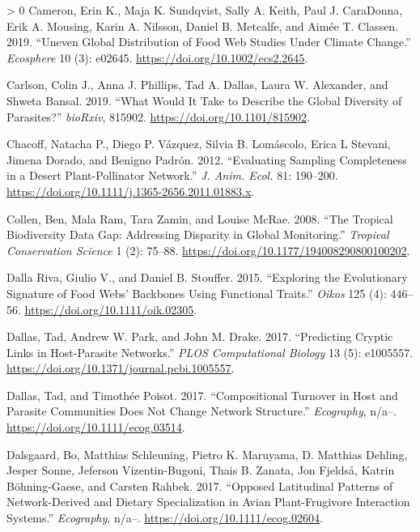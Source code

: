 \documentclass[11pt]{article}
\newlength{\cslhangindent}
\newenvironment{CSLReferences}[3] %
 {%
  \setlength{\parindent}{0pt}
  \ifodd #1 \everypar{\setlength{\hangindent}{\cslhangindent}}\ignorespaces\fi
  \ifnum #2 > 0
  \setlength{\parskip}{#2\baselineskip}
  \fi
 }%
 {}
\begin{document}
\begin{CSLReferences}{1}{0}
\leavevmode\hypertarget{ref-Cameron2019UneGlo}{}%
Cameron, Erin K., Maja K. Sundqvist, Sally A. Keith, Paul J. CaraDonna,
Erik A. Mousing, Karin A. Nilsson, Daniel B. Metcalfe, and Aimée T.
Classen. 2019. {``Uneven Global Distribution of Food Web Studies Under
Climate Change.''} \emph{Ecosphere} 10 (3): e02645.
\url{https://doi.org/10.1002/ecs2.2645}.

\leavevmode\hypertarget{ref-Carlson2019WhaWou}{}%
Carlson, Colin J., Anna J. Phillips, Tad A. Dallas, Laura W. Alexander,
and Shweta Bansal. 2019. {``What Would It Take to Describe the Global
Diversity of Parasites?''} \emph{bioRxiv}, 815902.
\url{https://doi.org/10.1101/815902}.

\leavevmode\hypertarget{ref-Chacoff2012EvaSam}{}%
Chacoff, Natacha P., Diego P. Vázquez, Silvia B. Lomáscolo, Erica L
Stevani, Jimena Dorado, and Benigno Padrón. 2012. {``Evaluating Sampling
Completeness in a Desert Plant-Pollinator Network.''} \emph{J. Anim.
Ecol.} 81: 190--200.
\url{https://doi.org/10.1111/j.1365-2656.2011.01883.x}.

\leavevmode\hypertarget{ref-Collen2008TroBio}{}%
Collen, Ben, Mala Ram, Tara Zamin, and Louise McRae. 2008. {``The
Tropical Biodiversity Data Gap: Addressing Disparity in Global
Monitoring.''} \emph{Tropical Conservation Science} 1 (2): 75--88.
\url{https://doi.org/10.1177/194008290800100202}.

\leavevmode\hypertarget{ref-DallaRiva2015ExpEvo}{}%
Dalla Riva, Giulio V., and Daniel B. Stouffer. 2015. {``Exploring the
Evolutionary Signature of Food Webs' Backbones Using Functional
Traits.''} \emph{Oikos} 125 (4): 446--56.
\url{https://doi.org/10.1111/oik.02305}.

\leavevmode\hypertarget{ref-Dallas2017PreCry}{}%
Dallas, Tad, Andrew W. Park, and John M. Drake. 2017. {``Predicting
Cryptic Links in Host-Parasite Networks.''} \emph{PLOS Computational
Biology} 13 (5): e1005557.
\url{https://doi.org/10.1371/journal.pcbi.1005557}.

\leavevmode\hypertarget{ref-Dallas2017ComTur}{}%
Dallas, Tad, and Timothée Poisot. 2017. {``Compositional Turnover in
Host and Parasite Communities Does Not Change Network Structure.''}
\emph{Ecography}, n/a--. \url{https://doi.org/10.1111/ecog.03514}.

\leavevmode\hypertarget{ref-Dalsgaard2017OppLat}{}%
Dalsgaard, Bo, Matthias Schleuning, Pietro K. Maruyama, D. Matthias
Dehling, Jesper Sonne, Jeferson Vizentin-Bugoni, Thais B. Zanata, Jon
Fjeldså, Katrin Böhning-Gaese, and Carsten Rahbek. 2017. {``Opposed
Latitudinal Patterns of Network-Derived and Dietary Specialization in
Avian Plant-Frugivore Interaction Systems.''} \emph{Ecography}, n/a--.
\url{https://doi.org/10.1111/ecog.02604}.


\end{CSLReferences}
\end{document}
